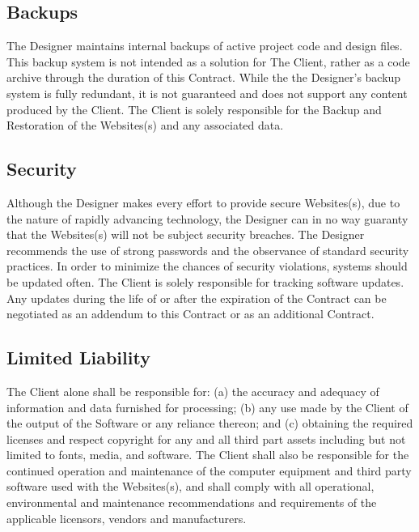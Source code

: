 \documentclass[a4paper,12pt]{article} %
\begin{document}

\subsection{Backups}

The Designer maintains internal backups of active project code and design files. This backup system is not intended as a solution for The Client, rather as a code archive through the duration of this Contract. While the the Designer's backup system is fully redundant, it is not guaranteed and does not support any content produced by the Client. The Client is solely responsible for the Backup and Restoration of the Websites(s) and any associated data.


\subsection{Security}

Although the Designer makes every effort to provide secure Websites(s), due to the nature of rapidly advancing technology, the Designer can in no way guaranty that the Websites(s) will not be subject security breaches. The Designer recommends the use of strong passwords and the observance of standard security practices. In order to minimize the chances of security violations, systems should be updated often. The Client is solely responsible for tracking software updates. Any updates during the life of or after the expiration of the Contract can be negotiated as an addendum to this Contract or as an additional Contract.


\subsection{Limited Liability}

The Client alone shall be responsible for: (a) the accuracy and adequacy of information and data furnished for processing; (b) any use made by the Client of the output of the Software or any reliance thereon; and (c) obtaining the required licenses and respect copyright for any and all third part assets including but not limited to fonts, media, and software. The Client shall also be responsible for the continued operation and maintenance of the computer equipment and third party software used with the Websites(s), and shall comply with all operational, environmental and maintenance recommendations and requirements of the applicable licensors, vendors and manufacturers.
\end{document}
